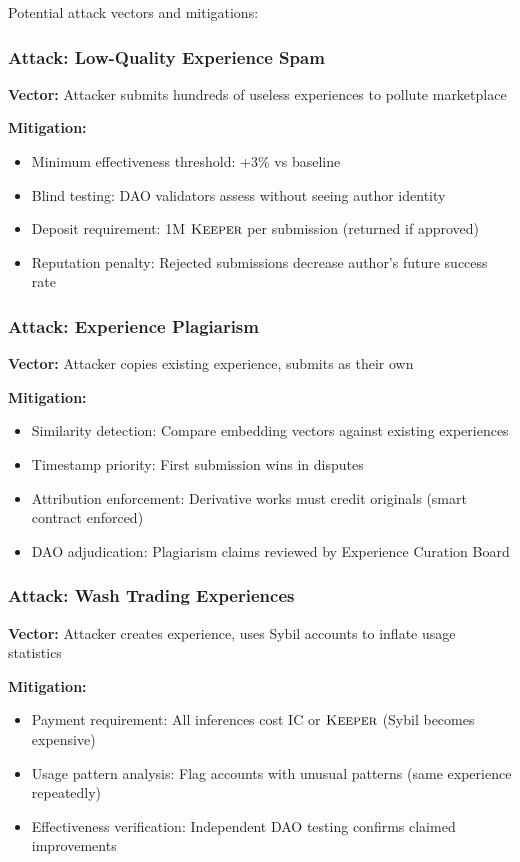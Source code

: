 \documentclass[11pt,letterpaper]{article}
\theoremstyle{definition}
\theoremstyle{remark}
\newcommand{\KEEPER}{\textsc{Keeper}}
\begin{document}
Potential attack vectors and mitigations:

\subsubsection{Attack: Low-Quality Experience Spam}

\textbf{Vector:} Attacker submits hundreds of useless experiences to pollute marketplace

\textbf{Mitigation:}
\begin{itemize}
\item Minimum effectiveness threshold: +3\% vs baseline
\item Blind testing: DAO validators assess without seeing author identity
\item Deposit requirement: 1M $\KEEPER$ per submission (returned if approved)
\item Reputation penalty: Rejected submissions decrease author's future success rate
\end{itemize}

\subsubsection{Attack: Experience Plagiarism}

\textbf{Vector:} Attacker copies existing experience, submits as their own

\textbf{Mitigation:}
\begin{itemize}
\item Similarity detection: Compare embedding vectors against existing experiences
\item Timestamp priority: First submission wins in disputes
\item Attribution enforcement: Derivative works must credit originals (smart contract enforced)
\item DAO adjudication: Plagiarism claims reviewed by Experience Curation Board
\end{itemize}

\subsubsection{Attack: Wash Trading Experiences}

\textbf{Vector:} Attacker creates experience, uses Sybil accounts to inflate usage statistics

\textbf{Mitigation:}
\begin{itemize}
\item Payment requirement: All inferences cost IC or $\KEEPER$ (Sybil becomes expensive)
\item Usage pattern analysis: Flag accounts with unusual patterns (same experience repeatedly)
\item Effectiveness verification: Independent DAO testing confirms claimed improvements
\end{itemize}
\end{document}
